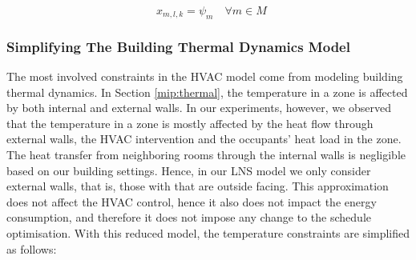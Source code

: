 \begin{equation} \label{eq:ms_everytype}
\mathop{\sum \limits_{l\in L_m, k \in K_m}} x_{m,l,k}= \psi_m \quad \forall m \in M
\end{equation}


\subsubsection{Simplifying The Building Thermal Dynamics Model}

The most involved constraints in the HVAC model come from modeling building thermal dynamics. In Section \ref{mip:thermal}, the temperature in a zone is affected by both internal and external walls. In our experiments, however, we observed that the temperature in a zone is mostly affected by the heat flow through external walls, the HVAC intervention and the occupants' heat load in the zone. The heat transfer from neighboring rooms through the internal walls is negligible based on our building settings. Hence, in our LNS model we only consider external walls, that is, those with that are outside facing. This approximation does not affect the HVAC control, hence it also does not impact the energy consumption, and therefore it does not impose any change to the schedule optimisation.
With this reduced model, the temperature constraints are simplified as follows:

